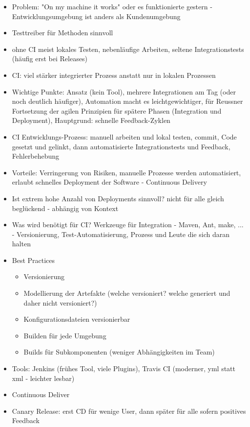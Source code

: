 \documentclass[paper=a4, fontsize=11pt]{scrartcl} %
\numberwithin{equation}{section} %
\numberwithin{figure}{section} %
\numberwithin{table}{section} %
\begin{document}
\begin{itemize}
  \item Problem: "On my machine it works" oder es funktionierte gestern - Entwicklungsumgebung ist anders als Kundenumgebung
  \item Testtreiber für Methoden sinnvoll
  \item ohne CI meist lokales Testen, nebenläufige Arbeiten, seltene Integrationstests (häufig erst bei Releases)
  \item CI: viel stärker integrierter Prozess anstatt nur in lokalen Prozessen
  \item Wichtige Punkte: Ansatz (kein Tool), mehrere Integrationen am Tag (oder noch deutlich häufiger), Automation macht es leichtgewichtiger, für Reussner Fortsetzung der agilen Prinzipien für spätere Phasen (Integration und Deployment), Hauptgrund: schnelle Feedback-Zyklen
  \item CI Entwicklungs-Prozess: manuell arbeiten und lokal testen, commit, Code gesetzt und gelinkt, dann automatisierte Integrationstests und Feedback, Fehlerbehebung
  \item Vorteile: Verringerung von Risiken, manuelle Prozesse werden automatisiert, erlaubt schnelles Deployment der Software - Continuous Delivery
  \item Ist extrem hohe Anzahl von Deployments sinnvoll? nicht für alle gleich beglückend - abhängig von Kontext
  \item Was wird benötigt für CI? Werkzeuge für Integration - Maven, Ant, make, ... - Versionierung, Test-Automatisierung, Prozess und Leute die sich daran halten
  \item Best Practices
  \begin{itemize}
    \item Versionierung
    \item Modellierung der Artefakte (welche versioniert? welche generiert und daher nicht versioniert?)
    \item Konfigurationsdateien versionierbar
    \item Builden für jede Umgebung
    \item Builds für Subkomponenten (weniger Abhängigkeiten im Team)
  \end{itemize}
  \item Tools: Jenkins (frühes Tool, viele Plugins), Travis CI (moderner, yml statt xml - leichter lesbar)
  \item Continuous Deliver
  \item Canary Release: erst CD für wenige User, dann später für alle sofern positives Feedback
\end{itemize}
\end{document}

